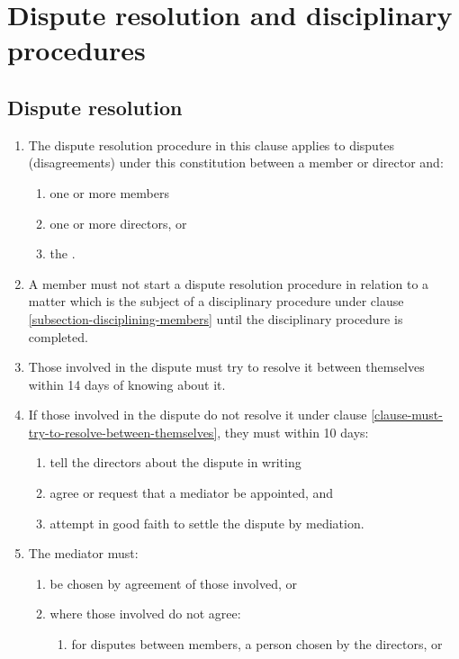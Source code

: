 \documentclass[a4paper]{article}
\let\emph\relax
\begin{document}
\section{Dispute resolution and disciplinary procedures}

\subsection{Dispute resolution}

\begin{enumerate}
\item The dispute resolution procedure in this clause applies to disputes (disagreements) under this constitution between a member or director and:
    \begin{enumerate}
    \item one or more members
    \item one or more directors, or
    \item the \emph{company}.
    \end{enumerate}
\item A member must not start a dispute resolution procedure in relation to a matter which is the subject of a disciplinary procedure under clause \ref{subsection-disciplining-members} until the disciplinary procedure is completed.
\item Those involved in the dispute must try to resolve it between themselves within 14 days of knowing about it.\label{clause-must-try-to-resolve-between-themselves}
\item If those involved in the dispute do not resolve it under clause \ref{clause-must-try-to-resolve-between-themselves}, they must within 10 days:
    \begin{enumerate}
    \item tell the directors about the dispute in writing
    \item agree or request that a mediator be appointed, and
    \item attempt in good faith to settle the dispute by mediation.
    \end{enumerate}
\item The mediator must:
    \begin{enumerate}
    \item be chosen by agreement of those involved, or
    \item where those involved do not agree:
        \begin{enumerate}
        \item for disputes between members, a person chosen by the directors, or\label{clause-mediator-chose-by-directors}

\end{enumerate}
\end{enumerate}
\end{enumerate}
\end{document}
